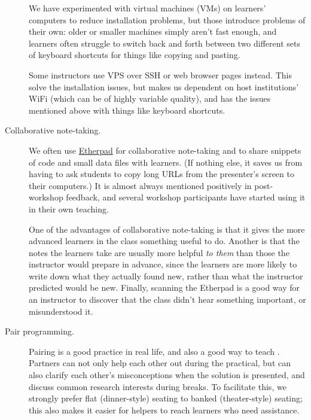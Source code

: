 \begin{description}
We have experimented with virtual machines (VMs) on learners' computers
to reduce installation problems, but those introduce problems of their
own: older or smaller machines simply aren't fast enough, and learners
often struggle to switch back and forth between two different sets of
keyboard shortcuts for things like copying and pasting.

Some instructors use VPS over SSH or web browser pages instead. This
solve the installation issues, but makes us dependent on host
institutions' WiFi (which can be of highly variable quality), and has
the issues mentioned above with things like keyboard shortcuts.
\item[Collaborative note-taking.]
We often use \href{http://etherpad.org}{Etherpad} for collaborative
note-taking and to share snippets of code and small data files with
learners. (If nothing else, it saves us from having to ask students to
copy long URLs from the presenter's screen to their computers.) It is
almost always mentioned positively in post-workshop feedback, and
several workshop participants have started using it in their own
teaching.

One of the advantages of collaborative note-taking is that it gives the
more advanced learners in the class something useful to do. Another is
that the notes the learners take are usually more helpful \emph{to them}
than those the instructor would prepare in advance, since the learners
are more likely to write down what they actually found new, rather than
what the instructor predicted would be new. Finally, scanning the
Etherpad is a good way for an instructor to discover that the class
didn't hear something important, or misunderstood it.
\item[Pair programming.]
Pairing is a good practice in real life, and also a
good way to teach \cite{bib:porter-what-works}. Partners can not only help each other out during the
practical, but can also clarify each other's misconceptions when the
solution is presented, and discuss common research interests during
breaks. To facilitate this, we strongly prefer flat (dinner-style)
seating to banked (theater-style) seating; this also makes it easier for
helpers to reach learners who need assistance.


\end{description}
